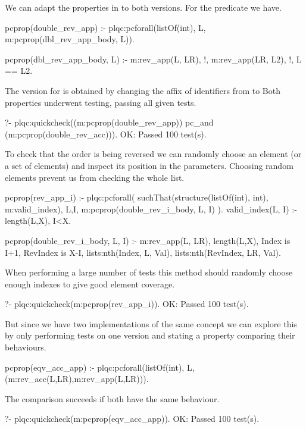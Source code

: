 We can adapt the properties in  to both versions.
%
%
For the  predicate we have.
\begin{yapcode}
 pcprop(double_rev_app) :-
   plqc:pcforall(listOf(int), L, m:pcprop({dbl_rev_app_body, L})).

 pcprop({dbl_rev_app_body, L}) :- 
   m:rev_app(L, LR), !, m:rev_app(LR, L2), !, L == L2.
\end{yapcode}
%
The version for  is obtained by changing the affix of
identifiers from  to 
%
Both properties underwent testing, passing all given tests.
%
\begin{yapcode}
   ?- plqc:quickcheck((m:pcprop(double_rev_app))
                 pc_and (m:pcprop(double_rev_acc))).
 OK: Passed 100 test(s).
\end{yapcode}

To check that the order is being reversed we can randomly choose an
element (or a %
 set of elements) and inspect
 its position in the parameters.
%
Choosing random elements prevent us from checking the whole list.
%
\begin{yapcode}
 pcprop(rev_app_i) :- plqc:pcforall(
     suchThat(structure({listOf(int), int}), m:valid_index),
     {L,I}, m:pcprop({double_rev_i_body, L, I}) ).
 valid_index({L, I}) :- length(L,X), I<X.

 pcprop({double_rev_i_body, L, I}) :- 
   m:rev_app(L, LR), length(L,X), Index is I+1, RevIndex is X-I,
   lists:nth(Index, L, Val), lists:nth(RevIndex, LR, Val).
\end{yapcode}
%
When performing a large number of tests this method should
 randomly choose enough indexes to 
give good
element coverage.
%
\begin{yapcode}
   ?- plqc:quickcheck(m:pcprop(rev_app_i)).
 OK: Passed 100 test(s).
\end{yapcode}


But since we have two implementations of the same concept we can explore
this by only performing tests on one version and stating a property
comparing their behaviours.
%
\begin{yapcode}
 pcprop(eqv_acc_app) :-
   plqc:pcforall(listOf(int), L, (m:rev_acc(L,LR),m:rev_app(L,LR))).
\end{yapcode}
The comparison succeeds if both have the same behaviour.
%
\begin{yapcode}
   ?- plqc:quickcheck(m:pcprop(eqv_acc_app)).
 OK: Passed 100 test(s).
\end{yapcode}

